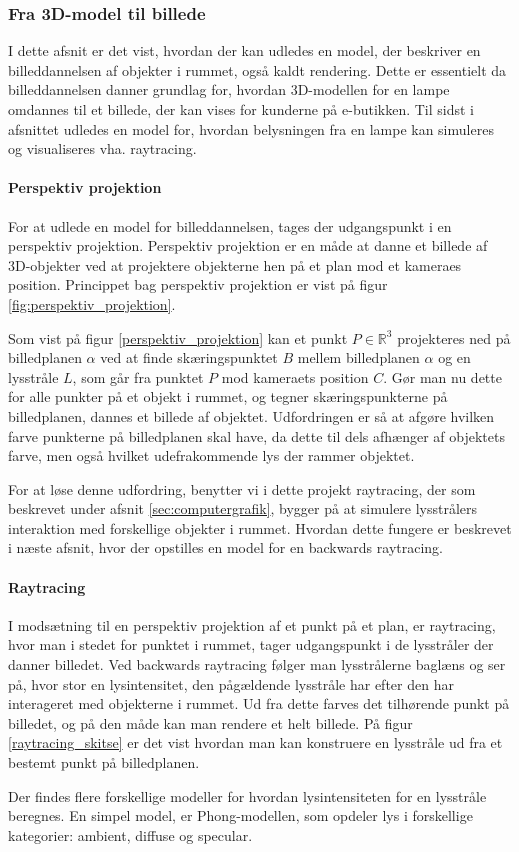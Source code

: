 \subsubsection{Fra 3D-model til billede}
I dette afsnit er det vist, hvordan der kan udledes en model, der beskriver en billeddannelsen af objekter i rummet, også kaldt rendering. Dette er essentielt da billeddannelsen danner grundlag for, hvordan 3D-modellen for en lampe omdannes til et billede, der kan vises for kunderne på e-butikken. Til sidst i afsnittet udledes en model for, hvordan belysningen fra en lampe kan simuleres og visualiseres vha. raytracing. 

\paragraph{Perspektiv projektion}
For at udlede en model for billeddannelsen, tages der udgangspunkt i en perspektiv projektion. Perspektiv projektion er en måde at danne et billede af 3D-objekter ved at projektere objekterne hen på et plan mod et kameraes position\cite{perspective_projection}. Princippet bag perspektiv projektion er vist på figur \ref{fig:perspektiv_projektion}.

Som vist på figur \ref{perspektiv_projektion} kan et punkt $P\in \mathbb{R}^3$ projekteres ned på billedplanen $\alpha$ ved at finde skæringspunktet $B$ mellem billedplanen $\alpha$ og en lysstråle $L$, som går fra punktet $P$ mod kameraets position $C$. Gør man nu dette for alle punkter på et objekt i rummet, og tegner skæringspunkterne på billedplanen, dannes et billede af objektet. Udfordringen er så at afgøre hvilken farve punkterne på billedplanen skal have, da dette til dels afhænger af objektets farve, men også hvilket udefrakommende lys der rammer objektet. 

For at løse denne udfordring, benytter vi i dette projekt raytracing, der som beskrevet under afsnit \ref{sec:computergrafik}, bygger på at simulere lysstrålers interaktion med forskellige objekter i rummet. Hvordan dette fungere er beskrevet i næste afsnit, hvor der opstilles en model for en backwards raytracing.

\paragraph{Raytracing}
I modsætning til en perspektiv projektion af et punkt på et plan, er raytracing, hvor man i stedet for punktet i rummet, tager udgangspunkt i de lysstråler der danner billedet. Ved backwards raytracing følger man lysstrålerne baglæns og ser på, hvor stor en lysintensitet, den pågældende lysstråle har efter den har interageret med objekterne i rummet. Ud fra dette farves det tilhørende punkt på billedet, og på den måde kan man rendere et helt billede. På figur \ref{raytracing_skitse} er det vist hvordan man kan konstruere en lysstråle ud fra et bestemt punkt på billedplanen. 

Der findes flere forskellige modeller for hvordan lysintensiteten for en lysstråle beregnes. En simpel model, er Phong-modellen, som opdeler lys i forskellige kategorier: ambient, diffuse og specular.









